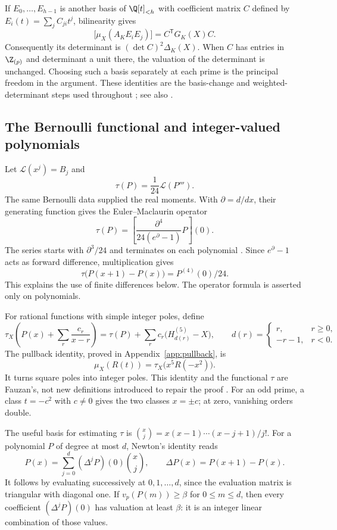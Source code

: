 If $E_0,\ldots,E_{h-1}$ is another basis of $\Q[t]_{<h}$ with
coefficient matrix $C$ defined by $E_i(t)=\sum_j C_{ji}t^j$,
bilinearity gives
\[
 \bigl[\mu_X(A_KE_iE_j)\bigr]=C^{\mathsf T}G_K(X)C.
\]
Consequently its determinant is $(\det C)^2\Delta_K(X)$.
When $C$ has entries in $\Z_{(p)}$ and determinant a unit there, the
valuation of the determinant is unchanged. Choosing such a basis
separately at each prime is the principal freedom in the argument.
These identities are the basis-change and weighted-determinant steps
used throughout \cite[\S\S3.3--4]{fauzan};
see also \cite[\texttt{BasisChange.lean}, \texttt{Val.lean}]{firsching}.

\subsection{The Bernoulli functional and integer-valued polynomials}

Let $\mathcal L(x^j)=B_j$ and
\[
 \tau(P)=\frac1{24}\mathcal L(P''').
\]
The same Bernoulli data supplied the real moments. With
\(\partial=d/dx\), their generating function gives the
Euler--Maclaurin operator
\[
 \tau(P)=
 \left[\frac{\partial^4}{24(e^\partial-1)}P\right](0).
\]
The series starts with \(\partial^3/24\) and terminates on each
polynomial \cite[24.2 and 24.4]{dlmf}. Since \(e^\partial-1\)
acts as forward difference, multiplication gives
\[
 \tau\bigl(P(x+1)-P(x)\bigr)=P^{(4)}(0)/24.
\]
This explains the use of finite differences below. The operator formula
is asserted only on polynomials.

For rational functions with simple integer poles, define
\[
 \tau_X\left(P(x)+\sum_r\frac{c_r}{x-r}\right)
 =\tau(P)+\sum_r c_r\bigl(H_{d(r)}^{(5)}-X\bigr),\qquad
 d(r)=
 \begin{cases}r,&r\ge0,\\-r-1,&r<0.\end{cases}
\]
The pullback identity, proved in Appendix~\ref{app:pullback}, is
\begin{equation}\label{arith:pullback}
 \mu_X(R(t))=\tau_X\bigl(x^5R(-x^2)\bigr).
\end{equation}
It turns square poles into integer poles. This identity and the
functional $\tau$ are Fauzan's, not new definitions introduced to repair
the proof \cite[\S3, (3.1)]{fauzan}.
For an odd prime, a class \(t=-c^2\) with \(c\ne0\) gives the two classes
\(x=\pm c\); at zero, vanishing orders double.

The useful basis for estimating $\tau$ is
$\binom{x}{j}=x(x-1)\cdots(x-j+1)/j!$.
For a polynomial $P$ of degree at most $d$, Newton's identity reads
\[
 P(x)=\sum_{j=0}^d(\Delta^jP)(0)\binom{x}{j},
 \qquad \Delta P(x)=P(x+1)-P(x).
\]
It follows by evaluating successively at $0,1,\ldots,d$, since the
evaluation matrix is triangular with diagonal one.
If $v_p(P(m))\ge\beta$ for $0\le m\le d$, then every coefficient
$(\Delta^jP)(0)$ has valuation at least $\beta$: it is an integer
linear combination of those values.

